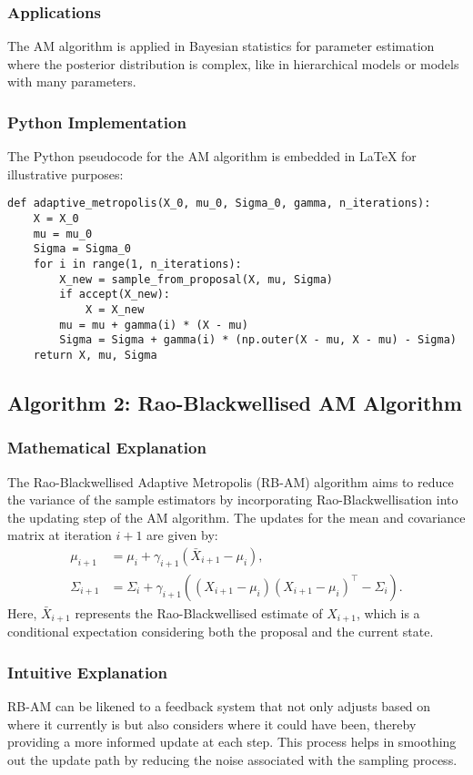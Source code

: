 \documentclass{article}
\begin{document}
\subsubsection{Applications}
The AM algorithm is applied in Bayesian statistics for parameter estimation where the posterior distribution is complex, like in hierarchical models or models with many parameters.

\subsubsection{Python Implementation}
The Python pseudocode for the AM algorithm is embedded in LaTeX for illustrative purposes:
\begin{verbatim}
def adaptive_metropolis(X_0, mu_0, Sigma_0, gamma, n_iterations):
    X = X_0
    mu = mu_0
    Sigma = Sigma_0
    for i in range(1, n_iterations):
        X_new = sample_from_proposal(X, mu, Sigma)
        if accept(X_new):
            X = X_new
        mu = mu + gamma(i) * (X - mu)
        Sigma = Sigma + gamma(i) * (np.outer(X - mu, X - mu) - Sigma)
    return X, mu, Sigma
\end{verbatim}

\subsection{Algorithm 2: Rao-Blackwellised AM Algorithm}

\subsubsection{Mathematical Explanation}
The Rao-Blackwellised Adaptive Metropolis (RB-AM) algorithm aims to reduce the variance of the sample estimators by incorporating Rao-Blackwellisation into the updating step of the AM algorithm. The updates for the mean and covariance matrix at iteration \( i+1 \) are given by:
\begin{align*}
\mu_{i+1} &= \mu_i + \gamma_{i+1}(\bar{X}_{i+1} - \mu_i), \\
\Sigma_{i+1} &= \Sigma_i + \gamma_{i+1}((X_{i+1} - \mu_i)(X_{i+1} - \mu_i)^\top - \Sigma_i).
\end{align*}
Here, \(\bar{X}_{i+1}\) represents the Rao-Blackwellised estimate of \(X_{i+1}\), which is a conditional expectation considering both the proposal and the current state.

\subsubsection{Intuitive Explanation}
RB-AM can be likened to a feedback system that not only adjusts based on where it currently is but also considers where it could have been, thereby providing a more informed update at each step. This process helps in smoothing out the update path by reducing the noise associated with the sampling process.
\end{document}
